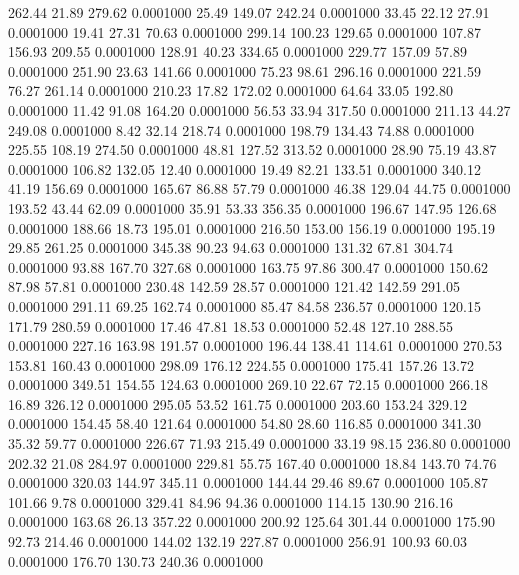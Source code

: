  262.44   21.89  279.62   0.0001000
  25.49  149.07  242.24   0.0001000
  33.45   22.12   27.91   0.0001000
  19.41   27.31   70.63   0.0001000
 299.14  100.23  129.65   0.0001000
 107.87  156.93  209.55   0.0001000
 128.91   40.23  334.65   0.0001000
 229.77  157.09   57.89   0.0001000
 251.90   23.63  141.66   0.0001000
  75.23   98.61  296.16   0.0001000
 221.59   76.27  261.14   0.0001000
 210.23   17.82  172.02   0.0001000
  64.64   33.05  192.80   0.0001000
  11.42   91.08  164.20   0.0001000
  56.53   33.94  317.50   0.0001000
 211.13   44.27  249.08   0.0001000
   8.42   32.14  218.74   0.0001000
 198.79  134.43   74.88   0.0001000
 225.55  108.19  274.50   0.0001000
  48.81  127.52  313.52   0.0001000
  28.90   75.19   43.87   0.0001000
 106.82  132.05   12.40   0.0001000
  19.49   82.21  133.51   0.0001000
 340.12   41.19  156.69   0.0001000
 165.67   86.88   57.79   0.0001000
  46.38  129.04   44.75   0.0001000
 193.52   43.44   62.09   0.0001000
  35.91   53.33  356.35   0.0001000
 196.67  147.95  126.68   0.0001000
 188.66   18.73  195.01   0.0001000
 216.50  153.00  156.19   0.0001000
 195.19   29.85  261.25   0.0001000
 345.38   90.23   94.63   0.0001000
 131.32   67.81  304.74   0.0001000
  93.88  167.70  327.68   0.0001000
 163.75   97.86  300.47   0.0001000
 150.62   87.98   57.81   0.0001000
 230.48  142.59   28.57   0.0001000
 121.42  142.59  291.05   0.0001000
 291.11   69.25  162.74   0.0001000
  85.47   84.58  236.57   0.0001000
 120.15  171.79  280.59   0.0001000
  17.46   47.81   18.53   0.0001000
  52.48  127.10  288.55   0.0001000
 227.16  163.98  191.57   0.0001000
 196.44  138.41  114.61   0.0001000
 270.53  153.81  160.43   0.0001000
 298.09  176.12  224.55   0.0001000
 175.41  157.26   13.72   0.0001000
 349.51  154.55  124.63   0.0001000
 269.10   22.67   72.15   0.0001000
 266.18   16.89  326.12   0.0001000
 295.05   53.52  161.75   0.0001000
 203.60  153.24  329.12   0.0001000
 154.45   58.40  121.64   0.0001000
  54.80   28.60  116.85   0.0001000
 341.30   35.32   59.77   0.0001000
 226.67   71.93  215.49   0.0001000
  33.19   98.15  236.80   0.0001000
 202.32   21.08  284.97   0.0001000
 229.81   55.75  167.40   0.0001000
  18.84  143.70   74.76   0.0001000
 320.03  144.97  345.11   0.0001000
 144.44   29.46   89.67   0.0001000
 105.87  101.66    9.78   0.0001000
 329.41   84.96   94.36   0.0001000
 114.15  130.90  216.16   0.0001000
 163.68   26.13  357.22   0.0001000
 200.92  125.64  301.44   0.0001000
 175.90   92.73  214.46   0.0001000
 144.02  132.19  227.87   0.0001000
 256.91  100.93   60.03   0.0001000
 176.70  130.73  240.36   0.0001000
